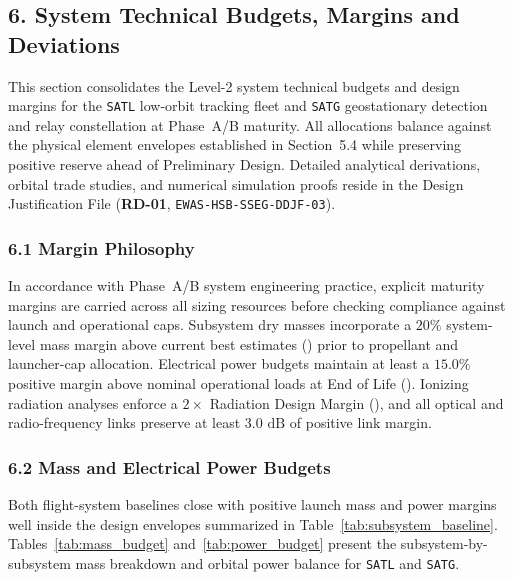 \subsection{6. System Technical Budgets, Margins and Deviations}

This section consolidates the Level-2 system technical budgets and design margins for the \texttt{SATL} low-orbit tracking fleet and \texttt{SATG} geostationary detection and relay constellation at Phase~A/B maturity. All allocations balance against the physical element envelopes established in Section~5.4 while preserving positive reserve ahead of Preliminary Design. Detailed analytical derivations, orbital trade studies, and numerical simulation proofs reside in the Design Justification File (\textbf{RD-01}, \texttt{EWAS-HSB-SSEG-DDJF-03}).

\subsubsection{6.1 Margin Philosophy}

In accordance with Phase~A/B system engineering practice, explicit maturity margins are carried across all sizing resources before checking compliance against launch and operational caps. Subsystem dry masses incorporate a $20\%$ system-level mass margin above current best estimates () prior to propellant and launcher-cap allocation. Electrical power budgets maintain at least a $15.0\%$ positive margin above nominal operational loads at End of Life (). Ionizing radiation analyses enforce a $2\times$ Radiation Design Margin (), and all optical and radio-frequency links preserve at least $3.0\text{ dB}$ of positive link margin.

\subsubsection{6.2 Mass and Electrical Power Budgets}

Both flight-system baselines close with positive launch mass and  power margins well inside the design envelopes summarized in Table~\ref{tab:subsystem_baseline}. Tables~\ref{tab:mass_budget} and~\ref{tab:power_budget} present the subsystem-by-subsystem mass breakdown and orbital power balance for \texttt{SATL} and \texttt{SATG}.

